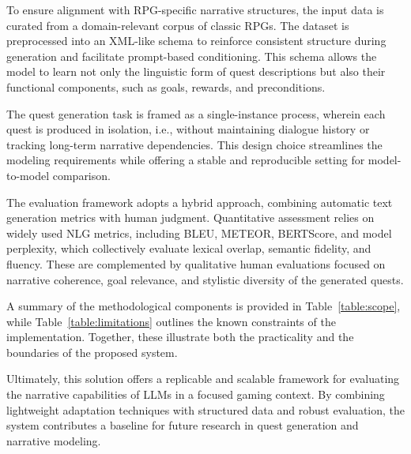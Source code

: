 To ensure alignment with RPG-specific narrative structures, the input data is curated
from a domain-relevant corpus of classic RPGs. The dataset is preprocessed into an XML-like
schema to reinforce consistent structure during generation and facilitate prompt-based
conditioning. This schema allows the model to learn not only the linguistic form
of quest descriptions but also their functional components, such as goals, rewards, and
preconditions.

The quest generation task is framed as a single-instance process, wherein each quest
is produced in isolation, i.e., without maintaining dialogue history or tracking long-term
narrative dependencies. This design choice streamlines the modeling requirements while
offering a stable and reproducible setting for model-to-model comparison.

The evaluation framework adopts a hybrid approach, combining automatic text generation
metrics with human judgment. Quantitative assessment relies on widely used NLG
metrics, including BLEU, METEOR, BERTScore, and model perplexity, which collectively
evaluate lexical overlap, semantic fidelity, and fluency. These are complemented by
qualitative human evaluations focused on narrative coherence, goal relevance, and stylistic
diversity of the generated quests.

A summary of the methodological components is provided in Table~\ref{table:scope}, while Table~\ref{table:limitations}
outlines the known constraints of the implementation. Together, these illustrate both the
practicality and the boundaries of the proposed system.

Ultimately, this solution offers a replicable and scalable framework for evaluating the
narrative capabilities of LLMs in a focused gaming context. By combining lightweight
adaptation techniques with structured data and robust evaluation, the system contributes
a baseline for future research in quest generation and narrative modeling.

\newpage

